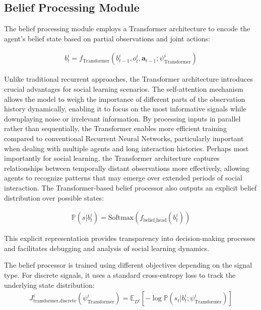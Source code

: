 \subsection{Belief Processing Module}

The belief processing module employs a Transformer architecture to encode the agent's belief state based on partial observations and joint actions:

\begin{align}
    b^i_t = f_{\text{Transformer}}(b^i_{t-1}, o^i_t, \boldsymbol{a}_{t-1}; \psi^i_{\text{Transformer}})
\end{align}

Unlike traditional recurrent approaches, the Transformer architecture introduces crucial advantages for social learning scenarios. The self-attention mechanism allows the model to weigh the importance of different parts of the observation history dynamically, enabling it to focus on the most informative signals while downplaying noise or irrelevant information. By processing inputs in parallel rather than sequentially, the Transformer enables more efficient training compared to conventional Recurrent Neural Networks, particularly important when dealing with multiple agents and long interaction histories. Perhaps most importantly for social learning, the Transformer architecture captures relationships between temporally distant observations more effectively, allowing agents to recognize patterns that may emerge over extended periods of social interaction. The Transformer-based belief processor also outputs an explicit belief distribution over possible states:

\begin{align}
    \mathbb{P}(s|b^i_t) = \text{Softmax}(f_{\text{belief\_head}}(b^i_t)) 
\end{align}

This explicit representation provides transparency into decision-making processes and facilitates debugging and analysis of social learning dynamics.

The belief processor is trained using different objectives depending on the signal type. For discrete signals, it uses a standard cross-entropy loss to track the underlying state distribution:
\begin{align}
    J^i_{\text{transformer,discrete}}(\psi^i_{\text{Transformer}}) = \mathbb{E}_{D^i}\left[-\log \mathbb{P}(s_t|b^i_t; \psi^i_{\text{Transformer}})\right]
\end{align}

